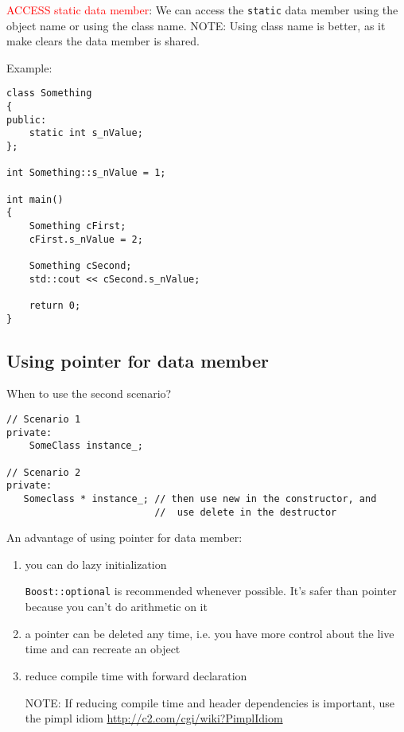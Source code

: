 \textcolor{red}{ACCESS static data member}: We can access the \verb!static! data
member using the object name or using the class name. NOTE: Using class name is
better, as it make clears the data member is shared.

Example:
\begin{Verbatim}
class Something
{
public:
    static int s_nValue;
};
 
int Something::s_nValue = 1;
 
int main()
{
    Something cFirst;
    cFirst.s_nValue = 2;
 
    Something cSecond;
    std::cout << cSecond.s_nValue;
 
    return 0;
}
\end{Verbatim}

\subsection{Using pointer for data member}

When to use the second scenario?

\begin{verbatim}
// Scenario 1
private:
    SomeClass instance_;
    
// Scenario 2
private:
   Someclass * instance_; // then use new in the constructor, and 
                          //  use delete in the destructor
\end{verbatim}

An advantage of using pointer for data member:
\begin{enumerate}
  \item you can do lazy initialization
  
  \verb!Boost::optional! is recommended whenever possible. It's safer than
  pointer because you can't do arithmetic on it
  
  \item a pointer can be deleted any time, i.e. you have more control about the
  live time and can recreate an object
  
  \item reduce compile time with forward declaration
  
  NOTE: If reducing compile time and header dependencies is important, use the
  pimpl idiom \url{http://c2.com/cgi/wiki?PimplIdiom}
  
  
\end{enumerate}

